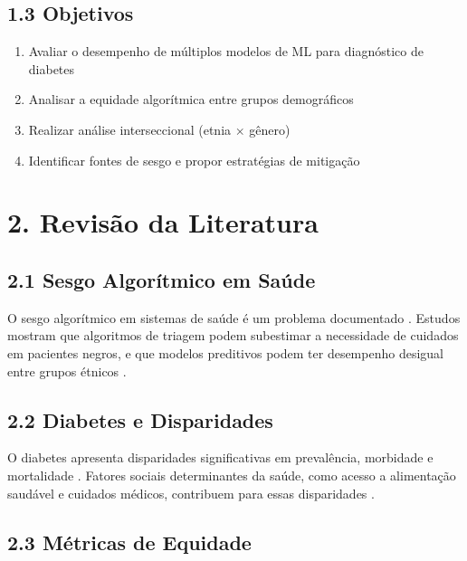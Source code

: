\documentclass[12pt,a4paper]{article}
\begin{document}
\subsection{1.3 Objetivos}

\begin{enumerate}
    \item Avaliar o desempenho de múltiplos modelos de ML para diagnóstico 
          de diabetes
    \item Analisar a equidade algorítmica entre grupos demográficos
    \item Realizar análise interseccional (etnia $\times$ gênero)
    \item Identificar fontes de sesgo e propor estratégias de mitigação
\end{enumerate}

\section{2. Revisão da Literatura}

\subsection{2.1 Sesgo Algorítmico em Saúde}

O sesgo algorítmico em sistemas de saúde é um problema documentado 
\cite{obermeyer2019}. Estudos mostram que algoritmos de triagem podem 
subestimar a necessidade de cuidados em pacientes negros, e que modelos 
preditivos podem ter desempenho desigual entre grupos étnicos 
\cite{chen2019}.

\subsection{2.2 Diabetes e Disparidades}

O diabetes apresenta disparidades significativas em prevalência, morbidade 
e mortalidade \cite{narayan2017}. Fatores sociais determinantes da saúde, 
como acesso a alimentação saudável e cuidados médicos, contribuem para 
essas disparidades \cite{hill2022}.

\subsection{2.3 Métricas de Equidade}
\end{document}
